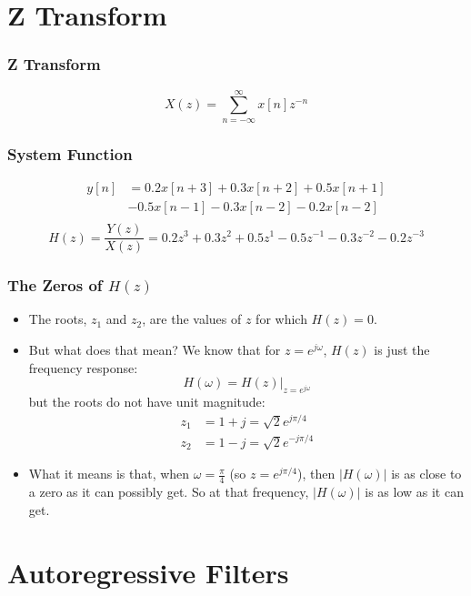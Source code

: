 \documentclass{beamer}
\begin{document}
\section[Z Transform]{Z Transform}
\setcounter{subsection}{1}

\begin{frame}
  \frametitle{Z Transform}
  \[
  X(z)   = \sum_{n=-\infty}^\infty x[n]z^{-n}
  \]
\end{frame}
\begin{frame}
  \frametitle{System Function}

  \begin{align*}
    y[n] &= 0.2x[n+3]+0.3x[n+2]+0.5x[n+1]\\
    &-0.5x[n-1]-0.3x[n-2]-0.2x[n-2]\\
  \end{align*}
  \[
  H(z)=\frac{Y(z)}{X(z)} = 0.2z^{3}+0.3z^{2}+0.5z^{1}-0.5z^{-1}-0.3z^{-2}-0.2z^{-3}
  \]
\end{frame}

\begin{frame}
  \frametitle{The Zeros of $H(z)$}

  \begin{itemize}
  \item The roots, $z_1$ and $z_2$, are the values of $z$ for which
    $H(z)=0$.
  \item But what does that mean?  We know that for $z=e^{j\omega}$,
    $H(z)$ is just the frequency response:
    \[
    H(\omega) = H(z)\vert_{z=e^{j\omega}}
    \]
    but the roots do not have unit magnitude:
    \begin{align*}
      z_1 &= 1+j =\sqrt{2}e^{j\pi/4}\\
      z_2 &= 1-j = \sqrt{2}e^{-j\pi/4}
    \end{align*}
  \item What it means is that, when $\omega=\frac{\pi}{4}$ (so
    $z=e^{j\pi/4}$), then $|H(\omega)|$ is as close to a zero as it
    can possibly get.  So at that frequency, $|H(\omega)|$ is as low
    as it can get.
  \end{itemize}
\end{frame}

\section[Autoregressive]{Autoregressive Filters}
\setcounter{subsection}{1}
\end{document}

